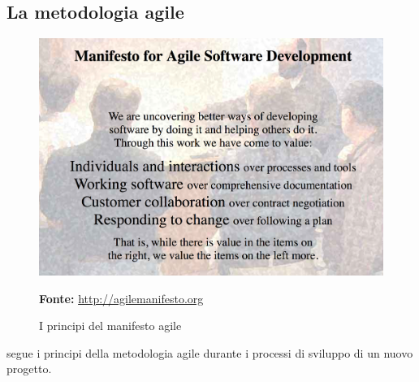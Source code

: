 \subsection{La metodologia agile}
\begin{figure}[H]
	\begin{center}
	\includegraphics[scale=0.25]{immagini/agile_manifesto.png}
	\caption{I principi del manifesto agile}
	\small{\textbf{Fonte:} \url{http://agilemanifesto.org}}
	\end{center}
\end{figure}
\lab{} segue i principi della metodologia agile durante i processi di sviluppo di un nuovo progetto.
